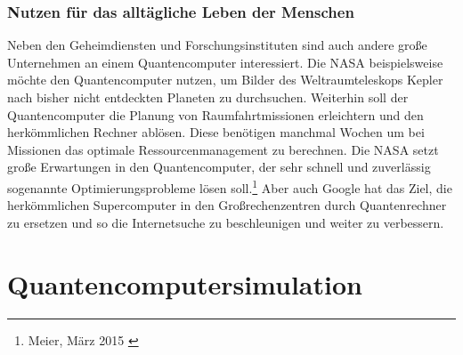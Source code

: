 \documentclass[12pt]{report}
\begin{document}
\subsection{Nutzen für das alltägliche Leben der Menschen}
 
 Neben den Geheimdiensten und Forschungsinstituten sind auch andere große Unternehmen an einem Quantencomputer interessiert. Die NASA beispielsweise möchte den Quantencomputer nutzen, um Bilder des Weltraumteleskops Kepler nach bisher nicht entdeckten Planeten zu durchsuchen. Weiterhin soll der Quantencomputer die Planung von Raumfahrtmissionen erleichtern und den herkömmlichen Rechner ablösen. Diese benötigen manchmal Wochen um bei Missionen das optimale Ressourcenmanagement zu berechnen. Die NASA setzt große Erwartungen in den Quantencomputer, der sehr schnell und zuverlässig sogenannte Optimierungsprobleme lösen soll.\footnote{Meier, März 2015 \cite{j33-1}}
Aber auch Google hat das Ziel, die herkömmlichen Supercomputer in den Großrechenzentren durch Quantenrechner zu ersetzen und so die Internetsuche zu beschleunigen und weiter zu verbessern.
 

\chapter{Quantencomputersimulation}
\end{document}
